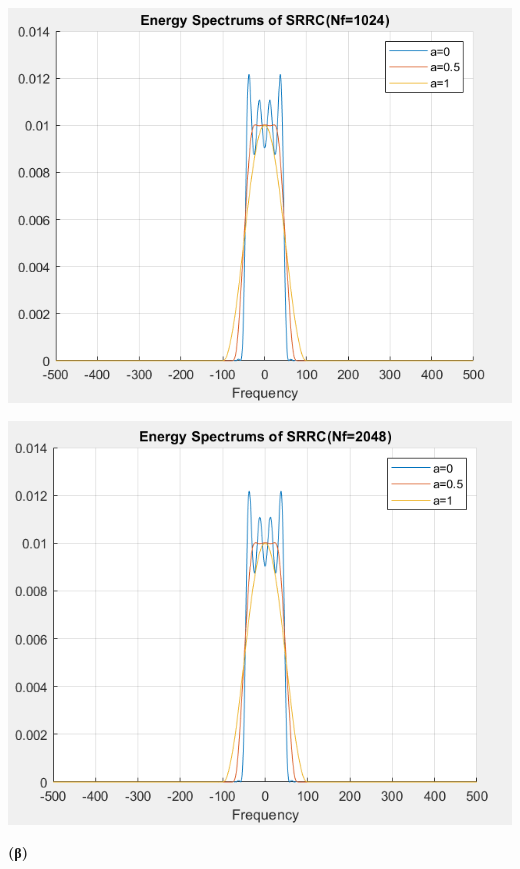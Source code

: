 \begin{minipage}[t]{0.5\textwidth}
    \includegraphics[width=\textwidth]{ALPHA/Images/A1.1024.png}
\end{minipage}
\hfill
\begin{minipage}[t]{0.49\textwidth}
    \includegraphics[width=\textwidth]{ALPHA/Images/A1.2048.png}
\end{minipage}

\begin{justify}
    \textbf{(β)}
\end{justify}

